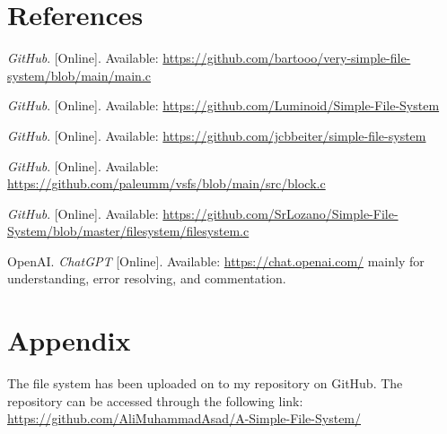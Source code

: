 \documentclass{article}
\theoremstyle{mytheoremstyle}
\theoremstyle{mytheoremstyle}
\theoremstyle{myproblemstyle}
\begin{document}
\newpage
\section{References}
\begin{thebibliography}{9}
    \textit{GitHub}. \hspace*{-1mm}[Online]. \hspace*{-1mm}Available: \hspace*{-2mm}\url{https://github.com/bartooo/very-simple-file-system/blob/main/main.c}

    \textit{GitHub}. \hspace*{-1mm}[Online]. \hspace*{-1mm}Available: \hspace*{-2mm}\url{https://github.com/Luminoid/Simple-File-System}

    \textit{GitHub}. \hspace*{-1mm}[Online]. \hspace*{-1mm}Available: \hspace*{-2mm}\url{https://github.com/jcbbeiter/simple-file-system}
    
    \textit{GitHub}. \hspace*{-1mm}[Online]. \hspace*{-1mm}Available: \hspace*{-2mm}\url{https://github.com/paleumm/vsfs/blob/main/src/block.c}

    \bibitem{}
    \textit{GitHub}. \hspace*{-1mm}[Online]. \hspace*{-1mm}Available: \hspace*{-2mm}\url{https://github.com/SrLozano/Simple-File-System/blob/master/filesystem/filesystem.c}


    OpenAI. \textit{ChatGPT} [Online]. Available: \hspace*{-2mm} \url{https://chat.openai.com/} mainly for understanding, error resolving, and commentation.
\end{thebibliography}

\appendix
\section{Appendix}
The file system has been uploaded on to my repository on GitHub. The repository can be accessed through the following link: \url{https://github.com/AliMuhammadAsad/A-Simple-File-System/}
\end{document}

